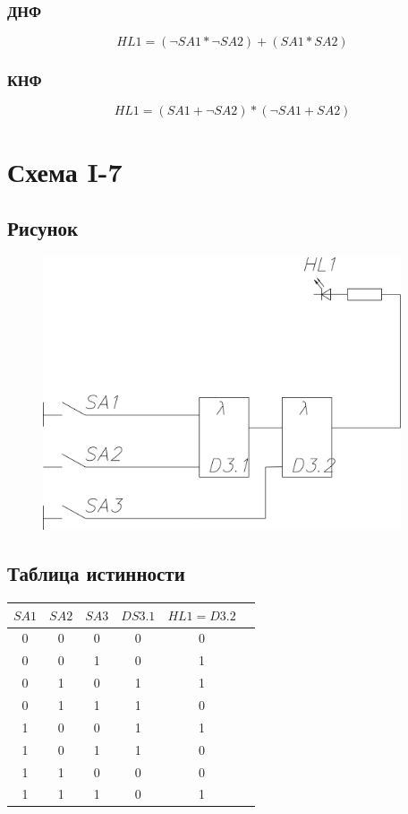 \documentclass[a4paper]{article}
\begin{document}
\subsubsection{ДНФ}
$$ HL1 = (\neg SA1 * \neg SA2) + (SA1 * SA2)$$
\subsubsection{КНФ}
$$ HL1 = (SA1 + \neg SA2) * (\neg SA1 + SA2)$$

\pagebreak


\section{Схема  I-7}
\subsection{Рисунок}
\begin{figure}[H]
    \centering
    \includegraphics[width=300pt]{7.png}
\end{figure}
\subsection{Таблица истинности}
\begin{table}[H]
    \centering
    \begin{tabular}{|c|c|c|c|c|c|}
        \hline
        $SA1$ & $SA2$ & $SA3$ & $DS3.1$ & $HL1 = D3.2$ \\
        \hline
        0 & 0 & 0 & 0 & 0\\
        0 & 0 & 1 & 0 & 1\\
        0 & 1 & 0 & 1 & 1\\
        0 & 1 & 1 & 1 & 0\\
        1 & 0 & 0 & 1 & 1\\
        1 & 0 & 1 & 1 & 0\\
        1 & 1 & 0 & 0 & 0\\
        1 & 1 & 1 & 0 & 1\\
        \hline
    \end{tabular}
\end{table}
\end{document}
